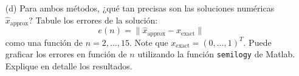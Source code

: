 \begin{enumerate}
    \item[(d)] Para ambos métodos, ¿qué tan precisas son las soluciones numéricas $\hat{x}_{\text{approx}}$? Tabule los errores de la solución:
    \[
    e(n) = \|\hat{x}_{\text{approx}} - x_{\text{exact}}\|
    \]
    como una función de $n = 2, \ldots, 15$. Note que $x_{\text{exact}} = (0, \ldots, 1)^T$. Puede graficar los errores en función de $n$ utilizando la función \texttt{semilogy} de Matlab. Explique en detalle los resultados.
\end{enumerate}


